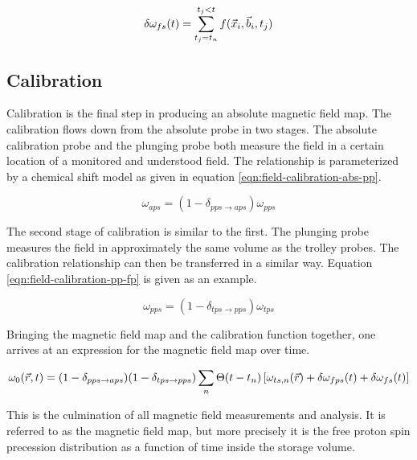 \begin{equation}
\label{eqn:field-interpolation-fm}
\delta \omega_{fs}(t) \\
= \sum_{t_j = t_n}^{t_j < t} f(\vec{x}_i, \vec{b}_i, t_j)
\end{equation}

\subsection{Calibration}

Calibration is the final step in producing an absolute magnetic field map.  The calibration flows down from the absolute probe in two stages.  The absolute calibration probe and the plunging probe both measure the field in a certain location of a monitored and understood field.  The relationship is parameterized by a chemical shift model as given in equation \ref{eqn:field-calibration-abs-pp}.

\begin{equation}
\label{eqn:field-calibration-abs-pp}
\omega_{aps} = (1 - \delta_{pps \rightarrow aps})\omega_{pps}
\end{equation}

The second stage of calibration is similar to the first.  The plunging probe measures the field in approximately the same volume as the trolley probes.  The calibration relationship can then be transferred in a similar way.  Equation \ref{eqn:field-calibration-pp-fp} is given as an example.

\begin{equation}
\label{eqn:field-calibration-pp-fp}
\omega_{pps} = (1 - \delta_{tps \rightarrow pps})\omega_{tps}
\end{equation}

Bringing the magnetic field map and the calibration function together, one arrives at an expression for the magnetic field map over time.

\begin{equation}
\label{eqn:field-omega-p}
\omega_0(\vec{r}, t) = (1 - \delta_{pps \rightarrow aps}) \\
(1 - \delta_{tps \rightarrow pps}) \sum_n \Theta(t - t_n) \\
\left[\omega_{ts,n}(\vec{r}) + \delta \omega_{fps}(t) + \delta \omega_{fs}(t)\right]
\end{equation}

\noindent
This is the culmination of all magnetic field measurements and analysis.  It is referred to as the magnetic field map, but more precisely it is the free proton spin precession distribution as a function of time inside the storage volume. 

